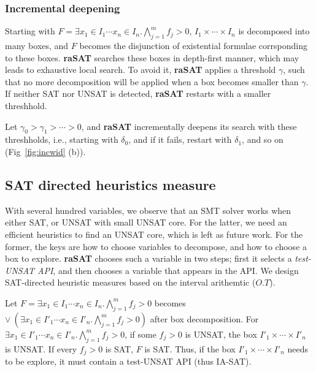 \documentclass[runningheads,a4paper,oribibl]{llncs}
\begin{document}
\subsubsection*{Incremental deepening}

Starting with $F = \exists x_1 \in I_1 \cdots x_n \in I_n. \bigwedge \limits_{j=1}^m f_j > 0$, 
$I_1 \times \cdots \times I_n$ is decomposed into many boxes, 
and $F$ becomes the disjunction of existential formulae corrsponding to these boxes. 
{\bf raSAT} searches these boxes in depth-first manner, which may leads to exhaustive local search. 
To avoid it, {\bf raSAT} applies a threshold $\gamma$, such that no more decomposition will be 
applied when a box becomes smaller than $\gamma$. 
If neither SAT nor UNSAT is detected, {\bf raSAT} restarts with a smaller threshhold. 

Let $\gamma_0 > \gamma_1 > \cdots > 0$, and {\bf raSAT} incrementally deepens its search 
with these threshholds, i.e., starting with $\delta_0$, and if it fails, restart with $\delta_1$, 
and so on (Fig~\ref{fig:incwid} (b)). 



\subsection{SAT directed heuristics measure} \label{sec:SATheuristics}

With several hundred variables, we observe that an SMT solver works 
when either SAT, or UNSAT with small UNSAT core.
%
For the latter, we need an efficient heuristics to find an UNSAT core, which is left as future work. 
For the former, the keys are how to choose variables to decompose, and 
how to choose a box to explore. 
{\bf raSAT} chooses such a variable in two steps; first it selects a {\em test-UNSAT API}, and
then chooses a variable that appears in the API. 
We design SAT-directed heuristic measures based on the interval arithemtic ($O.T$). 

\sloppy
Let $F = \exists x_1 \in I_1 \cdots x_n \in I_n. \bigwedge \limits_{j=1}^m f_j > 0$ 
becomes ${\vee~( \exists x_1 \in I'_1 \cdots x_n \in I'_n. \bigwedge \limits_{j=1}^m f_j > 0)}$ 
after box decomposition. 
For $\exists x_1 \in I'_1 \cdots x_n \in I'_n. \bigwedge \limits_{j=1}^m f_j > 0$, 
if some $f_j > 0$ is UNSAT, the box $I'_1 \times \cdots \times I'_n$ is UNSAT. 
If every $f_j > 0$ is SAT, $F$ is SAT. 
Thus, if the box $I'_1 \times \cdots \times I'_n$ needs to be explore, it must contain 
a test-UNSAT API (thus IA-SAT). 
\end{document}
